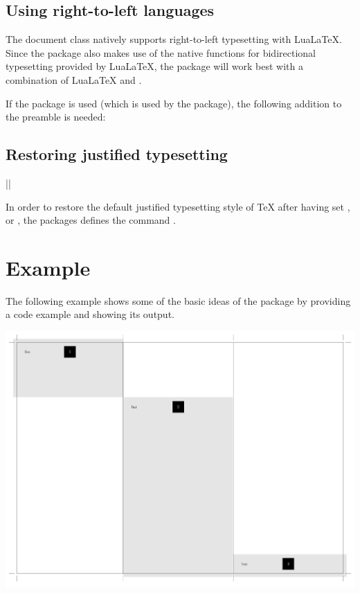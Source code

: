 \documentclass[a4paper]{article}
\begin{document}
\subsection{Using right-to-left languages}

The document class natively supports right-to-left typesetting with LuaLaTeX. Since the  package also makes use of the native functions for bidirectional typesetting provided by LuaLaTeX, the package will work best with a combination of LuaLaTeX and .

If the  package is used (which is used by the  package), the following addition to the preamble is needed:

\begin{codeexample}
\end{codeexample}

\subsection{Restoring justified typesetting}

\begin{macrodef}
|\leporellojustified|
\end{macrodef}
In order to restore the default justified typesetting style of TeX after having set \macro{\raggedright}, \macro{\raggedleft} or \macro{\centering}, the packages defines the command \macro{\leporellojustified}.

\section{Example}

The following example shows some of the basic ideas of the package by providing a code example and showing its output.

\begin{tcolorbox}
\setlength{\fboxsep}{0pt}
\colorbox{white}{\includegraphics[width=\linewidth]{doc/layout.pdf}}
\end{tcolorbox}
\end{document}
